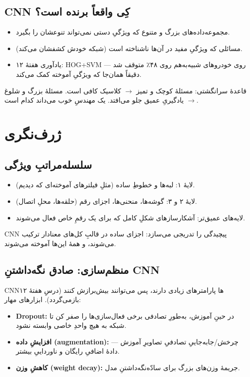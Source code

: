 \documentclass[12pt,a4paper]{article}
\begin{document}
\subsection{CNN کِی واقعاً برنده است؟}

\begin{itemize}
  \item مجموعه‌داده‌های بزرگ و متنوع که ویژگیِ دستی نمی‌تواند تنوعشان را بگیرد.
  \item مسائلی که ویژگیِ مفید در آن‌ها ناشناخته است (شبکه خودش کشفشان می‌کند).
  \item یادآوری هفتهٔ ۱۲: HOG+SVM روی خودروهای شبیه‌به‌هم روی ۴۸٪ متوقف شد — دقیقاً همان‌جا که ویژگیِ آموخته کمک می‌کند.
\end{itemize}

\begin{nokte}
قاعدهٔ سرانگشتی: مسئلهٔ کوچک و تمیز $\rightarrow$ کلاسیک کافی است. مسئلهٔ بزرگ و شلوغ $\rightarrow$ یادگیریِ عمیق جلو می‌افتد. یک مهندسِ خوب می‌داند کدام است.
\end{nokte}

\section{ژرف‌نگری}

\subsection{سلسله‌مراتبِ ویژگی}

\begin{itemize}
  \item لایهٔ ۱: لبه‌ها و خطوطِ ساده (مثلِ فیلترهای آموخته‌ای که دیدیم).
  \item لایهٔ ۲ و ۳: گوشه‌ها، منحنی‌ها، اجزای رقم (حلقه‌ها، محلِ اتصال).
  \item لایه‌های عمیق‌تر: آشکارسازهای شکلِ کامل که برای یک رقمِ خاص فعال می‌شوند.
\end{itemize}

CNN پیچیدگی را تدریجی می‌سازد: اجزای ساده در قالبِ کل‌های معنادار ترکیب می‌شوند، و همهٔ این‌ها آموخته می‌شوند.

\subsection{منظم‌سازی: صادق نگه‌داشتنِ CNN}

CNNها پارامترهای زیادی دارند، پس می‌توانند بیش‌برازش کنند (درسِ هفتهٔ ۱۲ بازمی‌گردد). ابزارهای مهار:

\begin{itemize}
  \item \textbf{Dropout:} در حینِ آموزش، به‌طورِ تصادفی برخی فعال‌سازی‌ها را صفر کن تا شبکه به هیچ واحدِ خاصی وابسته نشود.
  \item \textbf{افزایشِ داده (augmentation):} چرخش/جابه‌جاییِ تصادفیِ تصاویرِ آموزش — دادهٔ اضافیِ رایگان و ناورداییِ بیشتر.
  \item \textbf{کاهشِ وزن (weight decay):} جریمهٔ وزن‌های بزرگ برای سادّه‌نگه‌داشتنِ مدل.
\end{itemize}
\end{document}
